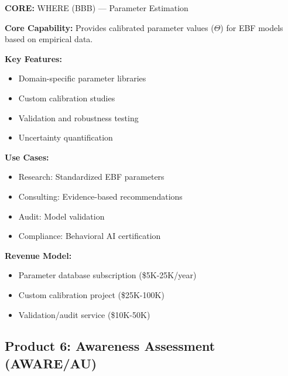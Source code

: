 \begin{tcolorbox}[colback=blue!5!white, colframe=blue!75!black,
    title=Product: EBF Calibration Service]

\textbf{CORE:} WHERE (BBB) --- Parameter Estimation

\textbf{Core Capability:}
Provides calibrated parameter values ($\Theta$) for EBF models based on empirical data.

\textbf{Key Features:}
\begin{itemize}[nosep]
\item Domain-specific parameter libraries
\item Custom calibration studies
\item Validation and robustness testing
\item Uncertainty quantification
\end{itemize}

\textbf{Use Cases:}
\begin{itemize}[nosep]
\item Research: Standardized EBF parameters
\item Consulting: Evidence-based recommendations
\item Audit: Model validation
\item Compliance: Behavioral AI certification
\end{itemize}

\textbf{Revenue Model:}
\begin{itemize}[nosep]
\item Parameter database subscription (\$5K-25K/year)
\item Custom calibration project (\$25K-100K)
\item Validation/audit service (\$10K-50K)
\end{itemize}

\end{tcolorbox}


\subsection{Product 6: Awareness Assessment (AWARE/AU)}

